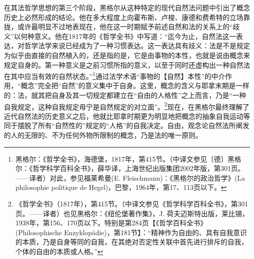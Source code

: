 在其法哲学思想的第三个阶段，黑格尔从这种特定的现代自然法问题中引出了概念历史上必然形成的结论。他在多大程度上向霍布斯、卢梭、康德和费希特的立场靠拢，或许最明显不过地表现在，他在这一时期赋予前述自然和法的关系上的“歧义”以何种意义。他在1817年的《哲学全书》中写道：“迄今为止，自然法这一表达，对哲学法学来说已经成为了一种习惯表达。这一表达具有歧义：法是不是规定为似乎由直接的自然植入的，还是指的是，它是由事物的本性，也就是说由概念来规定自身的。第一种意义是之前习惯所指的意义，以至于同时还虚构出一种自然法在其中应当有效的自然状态。”\footnote{黑格尔：《哲学全书》，海德堡，1817年，第415节。（中译文参见〔德〕黑格尔：《哲学科学百科全书》，薛华译，上海世纪出版集团2002年版，第301页。——译者）对此，参见福莱希曼(E. Fleischmann)：《黑格尔的政治哲学》(La philosophie politique de Hegel)，巴黎，1964年，第17、113页以下。}通过法学术语“事物的【自然】本性”的中介作用，“概念”完全把“自然”的意义集中于自身。这里，概念的含义与耶拿末期是一样的：法，就其把自身及其一切规定都建立在“自由的人格性”之上而言，乃是“一种自我规定，这种自我规定毋宁是自然规定的对立面”。\footnote{《哲学全书》（1817年），第415节。（中译文参见《哲学科学百科全书》，第301页。——译者）也见黑格尔：《纽伦堡著作集》，J. 荷夫迈斯特出版，莱比锡，1938年，第156、170页以下。特别是第284页【《哲学百科全书》(Philosophische Enzyklopädie)，第181节】：“精神作为自由的、具有自我意识的本质，乃是自身等同的自我，在其绝对否定性关联中首先进行排斥的自我，个体的自由的本质或人格。”}现在，在黑格尔最终理解了近代自然法的历史意义之后，他就比耶拿时期更为明显地把概念的抽象自我运动等同于摆脱了所有“自然性的”规定的“人格”的自我决定。自由，观念论自然法所阐发的人的无限的、不为任何外物所限制的概念，乃是法的唯一原则。

